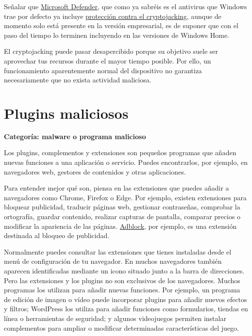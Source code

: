 \documentclass[
  spanish,
  a4paper,
  openany]{book}
\begin{document}
Señalar que \href{https://www.microsoft.com/es-es/windows/comprehensive-security}{Microsoft Defender}, que como ya sabréis es el antivirus que Windows trae por defecto ya incluye \href{https://www.microsoft.com/security/blog/2021/04/26/defending-against-cryptojacking-with-microsoft-defender-for-endpoint-and-intel-tdt/}{protección contra el cryptojacking}, aunque de momento solo está presente en la versión empresarial, es de suponer que con el paso del tiempo lo terminen incluyendo en las versiones de Windows Home.

El cryptojacking puede pasar desapercibido porque su objetivo suele ser aprovechar tus recursos durante el mayor tiempo posible. Por ello, un funcionamiento aparentemente normal del dispositivo no garantiza necesariamente que no exista actividad maliciosa.

\section{Plugins maliciosos}\label{plugins-maliciosos}

\textbf{Categoría: malware o programa malicioso}

Los plugins, complementos y extensiones son pequeños programas que añaden nuevas funciones a una aplicación o servicio. Puedes encontrarlos, por ejemplo, en navegadores web, gestores de contenidos y otras aplicaciones.

Para entender mejor qué son, piensa en las extensiones que puedes añadir a navegadores como Chrome, Firefox o Edge. Por ejemplo, existen extensiones para bloquear publicidad, traducir páginas web, gestionar contraseñas, comprobar la ortografía, guardar contenido, realizar capturas de pantalla, comparar precios o modificar la apariencia de las páginas. \href{https://getadblock.com/}{Adblock}, por ejemplo, es una extensión destinada al bloqueo de publicidad.

Normalmente puedes consultar las extensiones que tienes instaladas desde el menú de configuración de tu navegador. En muchos navegadores también aparecen identificadas mediante un icono situado junto a la barra de direcciones. Pero las extensiones y los plugins no son exclusivos de los navegadores. Muchos programas los utilizan para añadir nuevas funciones. Por ejemplo, un programa de edición de imagen o vídeo puede incorporar plugins para añadir nuevos efectos y filtros; WordPress los utiliza para añadir funciones como formularios, tiendas en línea o herramientas de seguridad; y algunos videojuegos permiten instalar complementos para ampliar o modificar determinadas características del juego.
\end{document}
